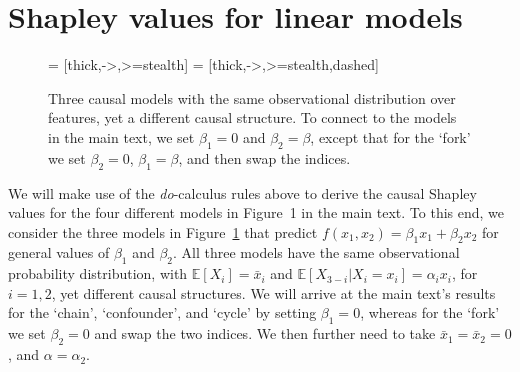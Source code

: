 \documentclass{article}
\newcommand{\expectation}{\mathbb{E}}
\newcommand{\bx}{\bar{x}}
\begin{document}
\section{Shapley values for linear models}

\begin{figure}
		\centering
		 = [thick,->,>=stealth]
		 = [thick,->,>=stealth,dashed]
	\caption{Three causal models with the same observational distribution over features, yet a different causal structure. To connect to the models in the main text, we set $\beta_1 = 0$ and $\beta_2 = \beta$, except that for the `fork' we set $\beta_2 = 0$, $\beta_1 = \beta$, and then swap the indices.}
	\label{fig:threemodels}
\end{figure}

We will make use of the {\em do}-calculus rules above to derive the causal Shapley values for the four different models in Figure~1 in the main text. To this end, we consider the three models in Figure~\ref{fig:threemodels} that predict $f(x_1,x_2) = \beta_1 x_1 + \beta_2 x_2$ for general values of $\beta_1$ and $\beta_2$. All three models have the same observational probability distribution, with $\expectation[X_i] = \bx_i$ and $\expectation[X_{3-i}|X_i=x_i] = \alpha_i x_i$, for $i = 1,2$, yet different causal structures. We will arrive at the main text's results for the `chain', `confounder', and `cycle' by setting $\beta_1 = 0$, whereas for the `fork' we set $\beta_2 = 0$ and swap the two indices. We then further need to take $\bx_1 = \bx_2 = 0$, and $\alpha = \alpha_2$.
\end{document}
